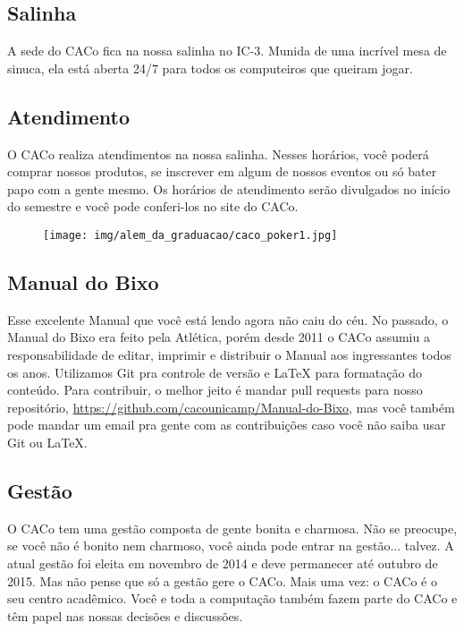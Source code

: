 \subsection{Salinha}

A sede do CACo fica na nossa salinha no IC-3. Munida de uma incrível mesa de
sinuca, ela está aberta 24/7 para todos os computeiros que queiram jogar.

\subsection{Atendimento}

O CACo realiza atendimentos na nossa salinha. Nesses horários, você poderá
comprar nossos produtos, se inscrever em algum de nossos eventos ou só bater
papo com a gente mesmo. Os horários de atendimento serão divulgados no início do
semestre e você pode conferi-los no site do CACo.

\begin{figure}[H]
    \centering
    \texttt{[image: img/alem\_da\_graduacao/caco\_poker1.jpg]}
\end{figure}

\subsection{Manual do Bixo}

Esse excelente Manual que você está lendo agora não caiu do céu. No passado, o
Manual do Bixo era feito pela Atlética, porém desde 2011 o CACo assumiu a
responsabilidade de editar, imprimir e distribuir o Manual aos ingressantes
todos os anos. Utilizamos Git pra controle de versão e {\LaTeX } para formatação
do conteúdo. Para contribuir, o melhor jeito é mandar pull requests para nosso
repositório, \url{https://github.com/cacounicamp/Manual-do-Bixo}, mas você
também pode mandar um email pra gente com as contribuições caso você não saiba
usar Git ou \LaTeX.

\subsection{Gestão}

O CACo tem uma gestão composta de gente bonita e charmosa. Não se preocupe, se
você não é bonito nem charmoso, você ainda pode entrar na gestão... talvez. A
atual gestão foi eleita em novembro de 2014 e deve permanecer até outubro de
2015. Mas não pense que só a gestão gere o CACo. Mais uma vez: o CACo é o seu
centro acadêmico. Você e toda a computação também fazem parte do CACo e têm
papel nas nossas decisões e discussões.

